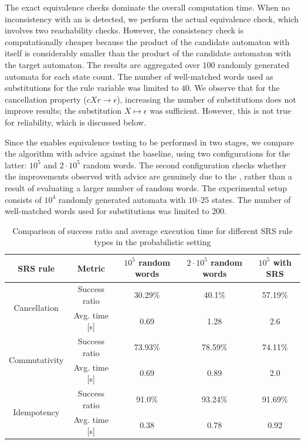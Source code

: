 The exact equivalence checks dominate the overall computation time. 
When no inconsistency with an \SRS is detected, we perform the actual equivalence check, which involves two reachability checks.
However, the consistency check is computationally cheaper  because the product of the candidate automaton with itself is considerably smaller than the product of the candidate automaton with the target automaton.
The results are aggregated over $100$ randomly generated automata for each state count.
The number of well-matched words used as substitutions for the rule variable was limited to $40$.
We observe that for the cancellation property ($c X r \to \epsilon$), increasing
the number of substitutions does not improve results; the substitution $X \mapsto \epsilon$ was sufficient. 
However, this is not true for reliability, which is discussed below.




Since the \SRS enables equivalence testing to be performed in two stages, 
we compare the algorithm with advice against the baseline, using two configurations for the latter: 
$10^5$ and $2 \cdot 10^5$ random words.
The second configuration checks whether the improvements observed with advice are genuinely due to the \SRS, 
rather than a result of evaluating a larger number of random words.
The experimental setup consists of $10^4$ randomly generated automata with $10$--$25$ states.
The number of well-matched words used for substitutions was limited to $200$.

\begin{table}[H]
\centering
\begin{tabular}{cc|ccc}
\hline
SRS rule & Metric
& $10^5$ random words
& $2\cdot10^5$ random words
& $10^5$ with SRS \\
\hline
\multirow{2}{*}{Cancellation}
& Success ratio & 30.29\% & 40.1\% & 57.19\% \\
& Avg. time [s] & 0.69 & 1.28 & 2.6 \\
\hline
\multirow{2}{*}{Commutativity}
& Success ratio & 73.93\% & 78.59\% & 74.11\% \\
& Avg. time [s] & 0.69 & 0.89 & 2.0 \\
\hline
\multirow{2}{*}{Idempotency}
& Success ratio & 91.0\% & 93.24\% & 91.69\% \\
& Avg. time [s] & 0.38 & 0.78 & 0.92 \\
\hline
\end{tabular}
\caption{Comparison of success ratio and average execution time for different SRS rule types in the probabilistic setting}
\end{table}

